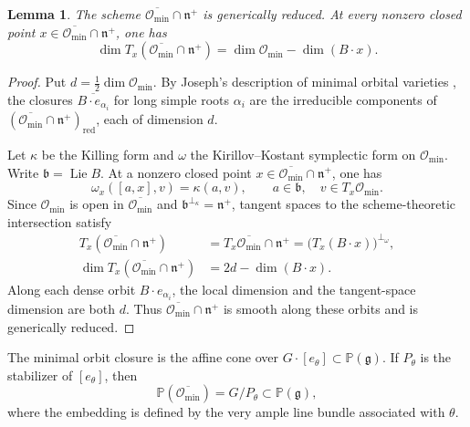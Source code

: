 \documentclass[12pt]{article}
\newtheorem{lemma}[theorem]{Lemma}
\theoremstyle{definition}
\newcommand{\g}{\mathfrak g}
\newcommand{\n}{\mathfrak n^{+}}
\newcommand{\omin}{\mathcal O_{\min}}
\newcommand{\oc}{\overline{\mathcal O_{\min}}}
\newcommand{\PP}{\mathbb P}
\begin{document}
\begin{lemma}\label{lem:generic}
    The scheme $\oc\cap\n$ is generically reduced. At every nonzero closed point $x\in\oc\cap\n$, one has
    $$
        \dim T_x(\oc\cap\n)=\dim\omin-\dim(B\cdot x).
    $$
\end{lemma}

\begin{proof}
    Put $d=\frac12\dim\omin$. By Joseph's description of minimal orbital varieties \cite[\S\S1.2, 2.4]{Jos98}, the closures $\overline{B\cdot e_{\alpha_i}}$ for long simple roots $\alpha_i$ are the irreducible components of $(\oc\cap\n)_{\mathrm{red}}$, each of dimension $d$.

    Let $\kappa$ be the Killing form and $\omega$ the Kirillov--Kostant symplectic form on $\omin$. Write $\mathfrak b=\operatorname{Lie}B$. At a nonzero closed point $x\in\oc\cap\n$, one has
    $$
        \omega_x([a,x],v)=\kappa(a,v),\qquad a\in\mathfrak b,\quad v\in T_x\omin.
    $$
    Since $\omin$ is open in $\oc$ and $\mathfrak b^{\perp_\kappa}=\n$, tangent spaces to the scheme-theoretic intersection satisfy
    \begin{align*}
        T_x(\oc\cap\n)
        &=T_x\oc\cap\n
        =\bigl(T_x(B\cdot x)\bigr)^{\perp_\omega},\\
        \dim T_x(\oc\cap\n)
        &=2d-\dim(B\cdot x).
    \end{align*}
    Along each dense orbit $B\cdot e_{\alpha_i}$, the local dimension and the tangent-space dimension are both $d$. Thus $\oc\cap\n$ is smooth along these orbits and is generically reduced.
\end{proof}

The minimal orbit closure is the affine cone over $G\cdot[e_\theta]\subset\PP(\g)$. If $P_\theta$ is the stabilizer of $[e_\theta]$, then
$$
    \PP(\oc)=G/P_\theta\subset\PP(\g),
$$
where the embedding is defined by the very ample line bundle associated with $\theta$.
\end{document}
